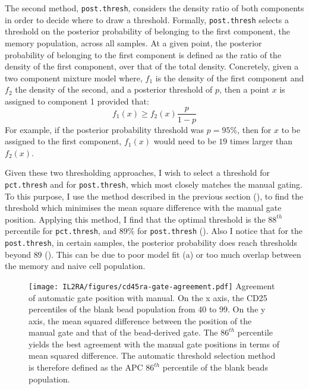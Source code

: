 The second method, \texttt{post.thresh}, considers the density ratio of both components in order to decide where to draw a threshold.
Formally, \texttt{post.thresh} selects a threshold on the posterior probability of belonging to the first component, the memory population, across all samples.
At a given point, the posterior probability of belonging to the first component is defined as the ratio of the density of the first component,
over that of the total density.
Concretely, given a two component mixture model where, $f_1$ is the density of the first component and $f_2$ the density of the second, and a posterior threshold of $p$,
then a point $x$ is assigned to component 1 provided that:
\[
  f_1(x) \geq f_2(x) \dfrac{p}{1-p}
\]
For example, if the posterior probability threshold was $p=95\%$, then for $x$ to be assigned to the first component, $f_1(x)$ would need to be $19$ times larger than $f_2(x)$.

Given these two thresholding approaches, I wish to select a threshold for \texttt{pct.thresh} and for \texttt{post.thresh}, which most closely matches the manual gating.
To this purpose, I use the method described in the previous section (), to find the threshold which minimises the mean square difference with the manual gate position.
Applying this method, I find that the optimal threshold is the $88^{th}$ percentile for \texttt{pct.thresh},
and $89\%$ for \texttt{post.thresh} ().
Also I notice that for the \texttt{post.thresh}, in certain samples,  the posterior probability does reach thresholds beyond $89$ ().
This can be due to poor model fit (a) or too much overlap between the memory and naive cell population.


\begin{figure}[h]
\centering
  \texttt{[image: IL2RA/figures/cd45ra-gate-agreement.pdf]}
{ Agreement of automatic gate position with manual. }
{
On the x axis, the CD25 percentiles of the blank bead population from 40 to 99.
On the y axis, the mean squared difference between the position of the manual gate and that of the bead-derived gate.
The $86^{th}$ percentile yields the best agreement with the manual gate positions in terms of mean squared difference.
The automatic threshold selection method  is therefore defined as the APC $86^{th}$ percentile of the blank beads population.
}
\end{figure}

